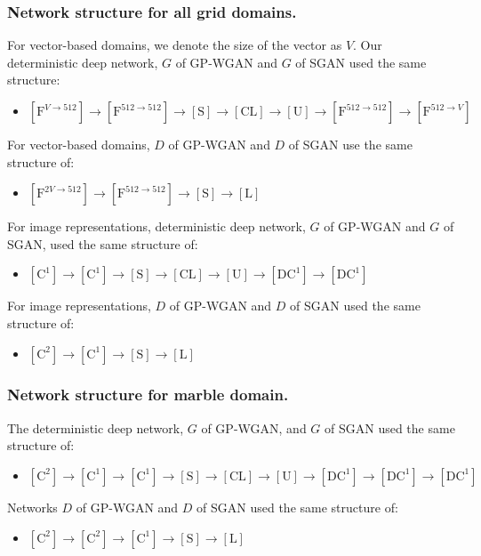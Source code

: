 \documentclass[letterpaper]{article} %
\begin{document}
\subsubsection{Network structure for all grid domains.}
For vector-based domains, we denote the size of the vector as $V$. Our deterministic deep network, $G$ of GP-WGAN and $G$ of SGAN used the same structure:
\begin{itemize}
    \item $[\text{F}^{V\rightarrow 512}]\rightarrow[\text{F}^{512\rightarrow 512}]\rightarrow[\text{S}]\rightarrow[\text{CL}]\rightarrow[\text{U}]\rightarrow[\text{F}^{512\rightarrow 512}]\rightarrow[\text{F}^{512\rightarrow V}]$
\end{itemize}
For vector-based domains, $D$ of GP-WGAN and $D$ of SGAN use the same structure of:
\begin{itemize}
    \item $[\text{F}^{2V\rightarrow 512}]\rightarrow[\text{F}^{512\rightarrow 512}]\rightarrow[\text{S}]\rightarrow[\text{L}]$
\end{itemize}
For image representations, deterministic deep network, $G$ of GP-WGAN and $G$ of SGAN, used the same structure of:
\begin{itemize}
    \item $[\text{C}^1]\rightarrow[\text{C}^1]\rightarrow [\text{S}]\rightarrow[\text{CL}]\rightarrow [\text{U}]\rightarrow[\text{DC}^1]\rightarrow[\text{DC}^1]$
\end{itemize}
For image representations, $D$ of GP-WGAN and $D$ of SGAN used the same structure of:
\begin{itemize}
    \item $[\text{C}^2]\rightarrow[\text{C}^1]\rightarrow[\text{S}]\rightarrow[\text{L}]$
\end{itemize}

\subsubsection{Network structure for marble domain.}
The deterministic deep network, $G$ of GP-WGAN, and $G$ of SGAN used the same structure of:
\begin{itemize}
    \item $[\text{C}^2]\rightarrow[\text{C}^1]\rightarrow[\text{C}^1]\rightarrow[\text{S}]\rightarrow[\text{CL}]\rightarrow[\text{U}]\rightarrow[\text{DC}^1]\rightarrow[\text{DC}^1]\rightarrow[\text{DC}^1]$
\end{itemize}
Networks $D$ of GP-WGAN and $D$ of SGAN used the same structure of:
\begin{itemize}
    \item $[\text{C}^2]\rightarrow[\text{C}^2]\rightarrow[\text{C}^1]\rightarrow[\text{S}]\rightarrow[\text{L}]$
\end{itemize}
\end{document}
